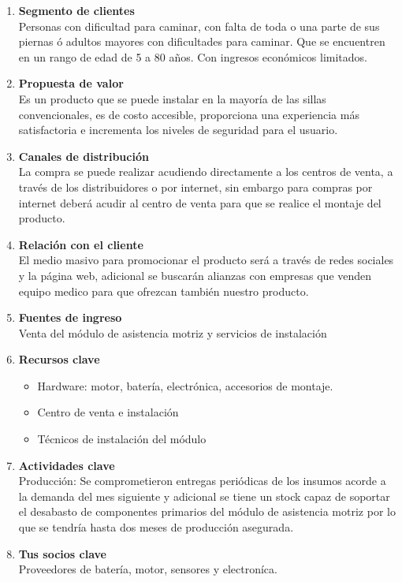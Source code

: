 \begin{enumerate}
    \item \textbf{Segmento de clientes}\\
Personas con dificultad para caminar, con falta de toda o una parte de sus piernas \'o  adultos mayores con dificultades para caminar. Que se encuentren en un rango de edad de 5 a 80 años. Con ingresos econ\'omicos limitados.

    \item \textbf{Propuesta de valor}\\
Es un producto que se puede instalar en la mayor\'ia de las sillas convencionales, es de costo accesible, proporciona una experiencia m\'as satisfactoria e incrementa los niveles de seguridad para el usuario.

    \item \textbf{Canales de distribuci\'on}\\
La compra se puede realizar acudiendo directamente a los centros de venta, a trav\'es de los distribuidores o por internet, sin embargo para compras por internet deber\'a acudir al centro de venta para que se realice el montaje del producto.

    \item \textbf{Relaci\'on con el cliente}\\
El medio masivo para promocionar el producto ser\'a a trav\'es de redes sociales y la p\'agina web, adicional se buscar\'an alianzas con empresas que venden equipo medico para que ofrezcan tambi\'en nuestro producto.

    \item \textbf{Fuentes de ingreso}\\
Venta del m\'odulo de asistencia motriz y servicios de instalaci\'on

    \item \textbf{Recursos clave}
        \begin{itemize}
            \item Hardware: motor, bater\'ia, electr\'onica, accesorios de montaje.
            \item Centro de venta e instalaci\'on
            \item T\'ecnicos de instalaci\'on del m\'odulo
        \end{itemize}

    \item \textbf{Actividades clave}\\
Producci\'on: Se comprometieron entregas peri\'odicas de los insumos acorde a la demanda del mes siguiente y adicional se tiene un stock capaz de soportar el desabasto de componentes primarios del m\'odulo de asistencia motriz por lo que se tendr\'ia hasta dos meses de producción asegurada.

    \item \textbf{Tus socios clave}\\
Proveedores de batería, motor, sensores y electron\'ica.

\end{enumerate}
